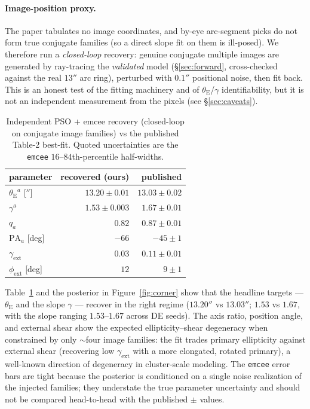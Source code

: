 \documentclass[11pt,letterpaper]{article}
\newcommand{\thetaE}{\ensuremath{\theta_{\mathrm{E}}}}
\newcommand{\gammaslope}{\ensuremath{\gamma}}
\newcommand{\gammaext}{\ensuremath{\gamma_{\mathrm{ext}}}}
\newcommand{\phiext}{\ensuremath{\phi_{\mathrm{ext}}}}
\begin{document}
\paragraph{Image-position proxy.} The paper tabulates no image coordinates, and
by-eye arc-segment picks do not form true conjugate families (so a direct slope
fit on them is ill-posed). We therefore run a \emph{closed-loop} recovery:
genuine conjugate multiple images are generated by ray-tracing the
\emph{validated} model (\S\ref{sec:forward}, cross-checked against the real
$13''$ arc ring), perturbed with $0.1''$ positional noise, then fit back. This
is an honest test of the fitting machinery and of $\thetaE$/$\gammaslope$
identifiability, but it is not an independent measurement from the pixels (see
\S\ref{sec:caveats}).

\begin{table}[ht]
\centering
\caption{Independent PSO + emcee recovery (closed-loop on conjugate image
families) vs the published Table-2 best-fit. Quoted uncertainties are the
\texttt{emcee} $16$--$84$th-percentile half-widths.}
\label{tab:recovery}
\begin{tabular}{lrr}
\toprule
parameter & recovered (ours) & published \\
\midrule
$\thetaE^a$ [$''$]      & $13.20 \pm 0.01$ & $13.03 \pm 0.02$ \\
$\gammaslope^a$         & $1.53 \pm 0.003$ & $1.67 \pm 0.01$  \\
$q_a$                   & $0.82$           & $0.87 \pm 0.01$  \\
$\mathrm{PA}_a$ [deg]   & $-66$            & $-45 \pm 1$      \\
$\gammaext$             & $0.03$           & $0.11 \pm 0.01$  \\
$\phiext$ [deg]         & $12$             & $9 \pm 1$        \\
\bottomrule
\end{tabular}
\end{table}

Table~\ref{tab:recovery} and the posterior in Figure~\ref{fig:corner} show that
the headline targets --- $\thetaE$ and the slope $\gammaslope$ --- recover in
the right regime ($13.20''$ vs $13.03''$; $1.53$ vs $1.67$, with the slope
ranging $1.53$--$1.67$ across DE seeds). The axis ratio, position angle, and
external shear show the expected ellipticity--shear degeneracy when constrained
by only $\sim$four image families: the fit trades primary ellipticity against
external shear (recovering low $\gammaext$ with a more elongated, rotated
primary), a well-known direction of degeneracy in cluster-scale modeling. The
\texttt{emcee} error bars are tight because the posterior is conditioned on a
single noise realization of the injected families; they understate the true
parameter uncertainty and should not be compared head-to-head with the
published $\pm$ values.
\end{document}
